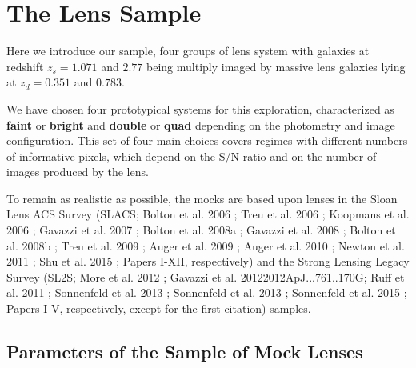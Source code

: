 \documentclass[a4paper,11pt]{article}
\begin{document}
\section{The Lens Sample}

Here we introduce our sample, four groups of lens system with galaxies at redshift $z_s = 1.071$ and $2.77$ being multiply imaged by massive lens galaxies lying at $z_d = 0.351$ and $0.783$.


We have chosen four prototypical systems for this exploration, characterized as \textbf{faint} or \textbf{bright} and \textbf{double} or \textbf{quad} depending on the photometry and image configuration. This set of four main choices covers regimes with different numbers of informative pixels, which depend on the S/N ratio and on the number of images produced by the lens.

To remain as realistic as possible, the mocks are based upon lenses in the Sloan Lens ACS Survey (SLACS; Bolton et al. 2006 \cite{2006ApJ...638..703B}; Treu et al. 2006 \cite{2006ApJ...640..662T}; Koopmans et al. 2006 \cite{2006ApJ...649..599K}; Gavazzi et al. 2007 \cite{2007ApJ...667..176G}; Bolton et al. 2008a \cite{2008ApJ...682..964B}; Gavazzi et al. 2008 \cite{2008ApJ...677.1046G}; Bolton et al. 2008b \cite{2008ApJ...684..248B}; Treu et al. 2009 \cite{2009ApJ...690..670T}; Auger et al. 2009 \cite{2009ApJ...705.1099A}; Auger et al. 2010 \cite{2010ApJ...724..511A}; Newton et al. 2011 \cite{2011ApJ...734..104N}; Shu et al. 2015 \cite{2014arXiv1407.2240S}; Papers I-XII, respectively) and the Strong Lensing Legacy Survey (SL2S; More et al. 2012 \cite{2012ApJ...749...38M}; Gavazzi et al. 2012{2012ApJ...761..170G}; Ruff et al. 2011 \cite{2011ApJ...727...96R}; Sonnenfeld et al. 2013 \cite{2013ApJ...777...97S}; Sonnenfeld et al. 2013 \cite{2013ApJ...777...98S}; Sonnenfeld et al. 2015 \cite{2015ApJ...800...94S}; Papers I-V, respectively, except for the first citation) samples. 

\subsection{Parameters of the Sample of Mock Lenses}
\end{document}
